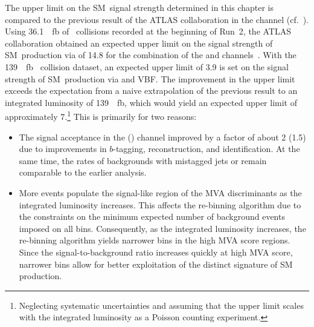 The upper limit on the SM~\HH signal strength determined in this chapter is
compared to the previous result of the ATLAS collaboration in the \bbtautau
channel (cf.~). Using \SI{36.1}{\per\femto\barn}
of \pp~collisions recorded at the beginning of Run~2, the ATLAS collaboration
obtained an expected upper limit on the signal strength of SM~\HH production via
\ggF of 14.8 for the combination of the \lephad and \hadhad
channels~\cite{HIGG-2016-16-witherratum}. With the \SI{139}{\per\femto\barn}
\pp~collision dataset, an expected upper limit of 3.9 is set on the signal
strength of SM~\HH production via \ggF and VBF. The improvement in the upper
limit exceeds the expectation from a naive extrapolation of the previous result
to an integrated luminosity of \SI{139}{\per\femto\barn}, which would yield an
expected upper limit of approximately 7.\footnote{Neglecting systematic
  uncertainties and assuming that the upper limit scales with the integrated
  luminosity as a Poisson counting experiment.} This is primarily for two
reasons:
\begin{itemize}

\item The signal acceptance in the \hadhad (\lephad) channel improved by a
  factor of about 2 (1.5) due to improvements in $b$-tagging, \tauhadvis
  reconstruction, and \tauhadvis identification. At the same time, the rates of
  backgrounds with mistagged jets or \faketauhadvis remain comparable to the
  earlier analysis.

\item More events populate the signal-like region of the MVA discriminants as
  the integrated luminosity increases. This affects the re-binning algorithm due
  to the constraints on the minimum expected number of background events imposed
  on all bins. Consequently, as the integrated luminosity increases, the
  re-binning algorithm yields narrower bins in the high MVA score regions. Since
  the signal-to-background ratio increases quickly at high MVA score, narrower
  bins allow for better exploitation of the distinct signature of SM~\HH
  production.

\end{itemize}

